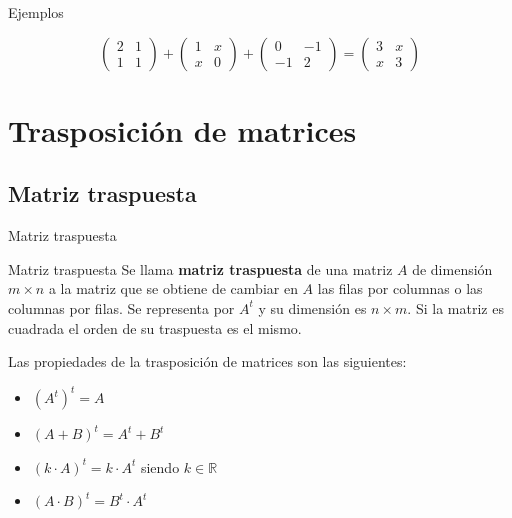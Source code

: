 \documentclass[9pt]{beamer}
\newcommand{\R}{\mathbb{R}}
\begin{document}
\begin{frame}{Ejemplos}
\begin{enumerate}
{\[ 
\begin{pmatrix}
	2 & 1 \\
	1 & 1
\end{pmatrix} +  
\begin{pmatrix}
 	1 & x \\ 
 	x & 0
\end{pmatrix}
+\begin{pmatrix}
	0 & -1 \\
	-1 & 2
\end{pmatrix}=
\begin{pmatrix}
	3 & x \\
	x & 3
\end{pmatrix}
\]}

\end{enumerate}


\end{frame}

\section{Trasposición de matrices}
\subsection{Matriz traspuesta}
\begin{frame}{Matriz traspuesta}
\begin{alertblock}{Matriz traspuesta}
Se llama \textbf{matriz traspuesta} de una matriz $A$ de dimensión $m \times n$ a la matriz que se obtiene de cambiar en $A$ las filas por columnas o las columnas por filas. Se representa por $A^t$ y su dimensión es $n \times m$. Si la matriz es cuadrada el orden de su traspuesta es el mismo.
\end{alertblock}

\pause
Las propiedades de la trasposición de matrices son las siguientes:
\begin{itemize}[<+- |alert@+>]
\item $\left( A^t \right)^t = A$
\item $(A+B)^t = A^t + B^t$
\item $(k\cdot A)^t = k  \cdot A^t $ siendo $ k \in \R$
\item $(A \cdot B)^t = B^t \cdot A^t$
\end{itemize}

\end{frame}
\end{document}
